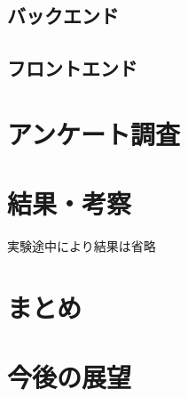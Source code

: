 \documentclass[twocolumn, fleqn, uplatex]{jsarticle}
\begin{document}
\subsection{バックエンド}
\subsection{フロントエンド}

\section{アンケート調査}

\section{結果・考察}
実験途中により結果は省略
\section{まとめ}
\section{今後の展望}
\end{document}
